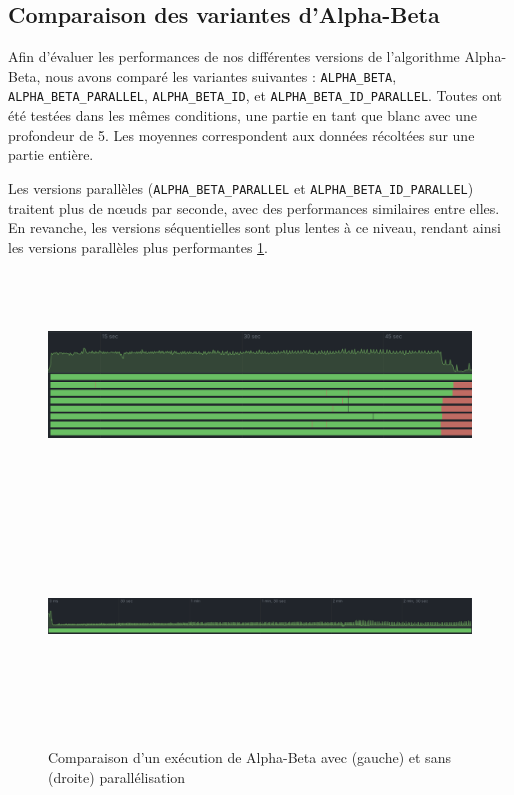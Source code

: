 \documentclass{article}
\begin{document}
\subsection{Comparaison des variantes d'Alpha-Beta} Afin d'évaluer les performances de nos différentes versions de l'algorithme Alpha-Beta, nous avons comparé les variantes suivantes : \texttt{ALPHA\_BETA}, \texttt{ALPHA\_BETA\_PARALLEL}, \texttt{ALPHA\_BETA\_ID}, et \texttt{ALPHA\_BETA\_ID\_PARALLEL}. Toutes ont été testées dans les mêmes conditions, une partie en tant que blanc avec une profondeur de 5. Les moyennes correspondent aux données récoltées sur une partie entière.

Les versions parallèles (\texttt{ALPHA\_BETA\_PARALLEL} et \texttt{ALPHA\_BETA\_ID\_PARALLEL}) traitent plus de nœuds par seconde, avec des performances similaires entre elles. En revanche, les versions séquentielles sont plus lentes à ce niveau, rendant ainsi les versions parallèles plus performantes \ref{parallel_cmp_trace}.

\begin{figure}[h]
    \centering
    \includegraphics[width=\textwidth,height=6.0cm,keepaspectratio]{with_parallel.png}
    \includegraphics[width=\textwidth,height=6.0cm,keepaspectratio]{without_parallel.png}
    \caption{Comparaison d'un exécution de Alpha-Beta avec (gauche) et sans (droite) parallélisation}
    \label{parallel_cmp_trace}
\end{figure}
\FloatBarrier
\end{document}
